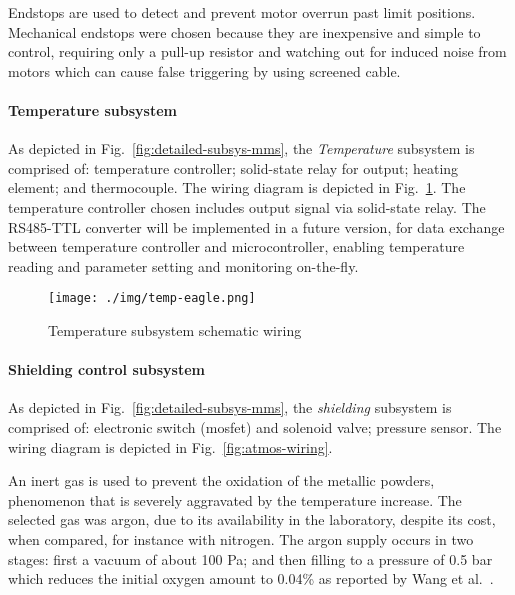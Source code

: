 Endstops are used to detect and
prevent motor overrun past limit positions. Mechanical endstops were chosen
because they are inexpensive and simple to control, requiring only a pull-up
resistor and watching out for induced noise from motors which can cause false
triggering by using screened cable. 
% 

\paragraph{Temperature subsystem}
As depicted in Fig.~\ref{fig:detailed-subsys-mms}, the \emph{Temperature}
subsystem is comprised of: temperature controller; solid-state relay for output;
heating element; and thermocouple. The wiring diagram is depicted in Fig.~\ref{fig:temp-wiring}. The
temperature controller chosen includes output signal via solid-state relay. The
RS485-TTL converter will be implemented in a future version, for data exchange
between temperature controller and microcontroller, enabling temperature reading
and parameter setting and monitoring on-the-fly.

\begin{figure}[!hbt]
  \centering
  \texttt{[image: ./img/temp-eagle.png]}
  \caption{Temperature subsystem schematic wiring}%
  \label{fig:temp-wiring}
\end{figure}

\paragraph{Shielding control subsystem}
As depicted in Fig.~\ref{fig:detailed-subsys-mms}, the \emph{shielding}
subsystem is comprised of: electronic switch (mosfet) and solenoid valve;
pressure sensor. The wiring diagram is depicted in Fig.~\ref{fig:atmos-wiring}.

An inert gas is used to prevent the oxidation of the metallic powders,
phenomenon that is severely aggravated by the temperature increase. The selected
gas was argon, due to its availability in the laboratory, despite its cost,
when compared, for instance with nitrogen. The argon supply occurs in two
stages: first a vacuum of about 100 Pa; and then filling to a pressure of 0.5
bar which reduces the initial oxygen amount to 0.04\% as reported by Wang et al.~\cite{wang2002direct}.

